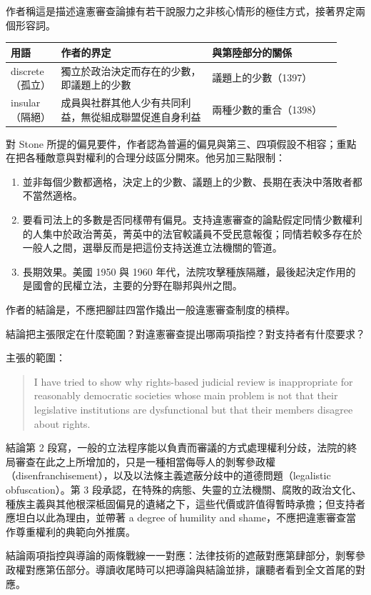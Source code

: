 作者稱這是描述違憲審查論據有若干說服力之非核心情形的極佳方式，接著界定兩個形容詞。

\begin{longtable}{@{}L{0.14\linewidth}L{0.42\linewidth}L{0.36\linewidth}@{}}
\toprule
用語 & 作者的界定 & 與第陸部分的關係 \\
\midrule
\endhead
discrete（孤立） & 獨立於政治決定而存在的少數，即議題上的少數 & 議題上的少數（1397） \\
insular（隔絕） & 成員與社群其他人少有共同利益，無從組成聯盟促進自身利益 & 兩種少數的重合（1398） \\
\bottomrule
\end{longtable}

對 Stone 所提的偏見要件，作者認為普遍的偏見與第三、四項假設不相容；重點在把各種敵意與對權利的合理分歧區分開來。他另加三點限制：

\begin{enumerate}
\item 並非每個少數都適格，決定上的少數、議題上的少數、長期在表決中落敗者都不當然適格。
\item 要看司法上的多數是否同樣帶有偏見。支持違憲審查的論點假定同情少數權利的人集中於政治菁英，菁英中的法官較議員不受民意報復；同情若較多存在於一般人之間，選舉反而是把這份支持送進立法機關的管道。
\item 長期效果。美國 1950 與 1960 年代，法院攻擊種族隔離，最後起決定作用的是國會的民權立法，主要的分野在聯邦與州之間。
\end{enumerate}

作者的結論是，不應把腳註四當作撬出一般違憲審查制度的槓桿。


\begin{qaquestion}
結論把主張限定在什麼範圍？對違憲審查提出哪兩項指控？對支持者有什麼要求？
\end{qaquestion}

主張的範圍：

\begin{quote}
I have tried to show why rights-based judicial review is inappropriate for reasonably democratic societies whose main problem is not that their legislative institutions are dysfunctional but that their members disagree about rights.
\end{quote}

結論第 2 段寫，一般的立法程序能以負責而審議的方式處理權利分歧，法院的終局審查在此之上所增加的，只是一種相當侮辱人的剝奪參政權（disenfranchisement），以及以法條主義遮蔽分歧中的道德問題（legalistic obfuscation）。第 3 段承認，在特殊的病態、失靈的立法機關、腐敗的政治文化、種族主義與其他根深柢固偏見的遺緒之下，這些代價或許值得暫時承擔；但支持者應坦白以此為理由，並帶著 a degree of humility and shame，不應把違憲審查當作尊重權利的典範向外推廣。

\begin{readernote}
結論兩項指控與導論的兩條戰線一一對應：法律技術的遮蔽對應第肆部分，剝奪參政權對應第伍部分。導讀收尾時可以把導論與結論並排，讓聽者看到全文首尾的對應。
\end{readernote}
